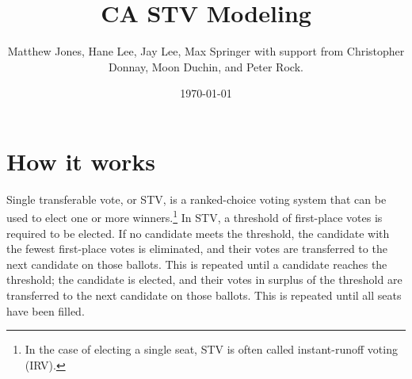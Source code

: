 \documentclass{amsart}
\title{CA STV Modeling}
\author{Matthew Jones, Hane Lee, Jay Lee, Max Springer with support from Christopher Donnay, Moon Duchin, and Peter Rock.}
\date{\today}
\theoremstyle{definition}
\begin{document}
\maketitle


\section{How it works}
Single transferable vote, or STV, is a ranked-choice voting system that can be used to elect 
one or more winners.\footnote{In the case of electing a single seat, STV is often called 
instant-runoff voting (IRV).} In STV, a threshold of first-place votes is required to be elected.
If no candidate meets the threshold, the candidate with the fewest first-place votes is eliminated,
and their votes are transferred to the next candidate on those ballots.
This is repeated until a candidate reaches the threshold; the candidate is elected, and
their votes in surplus of the threshold are transferred to the next candidate on those ballots.
This is repeated until all seats have been filled.
\end{document}
